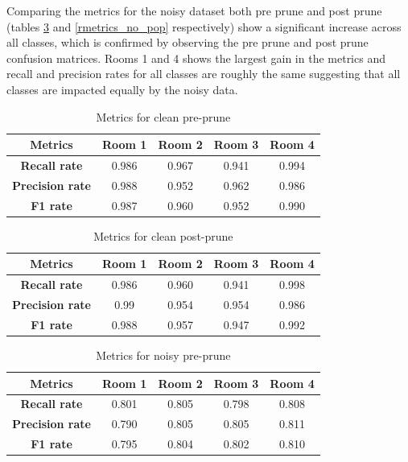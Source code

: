 \documentclass{article}
\begin{document}
Comparing the metrics for the noisy dataset both pre prune and post prune (tables \ref{rmetrics_no_pp} and \ref{rmetrics_no_pop} respectively) show a significant increase across all classes, which is confirmed by observing the pre prune and post prune confusion matrices. Rooms 1 and 4 shows the largest gain in the metrics and recall and precision rates for all classes are roughly the same suggesting that all classes are impacted equally by the noisy data.



\begin{table}[]
\begin{tabular}{|c|c|c|c|c|}
\hline
Metrics                  & \textbf{Room 1} & \textbf{Room 2} & \textbf{Room 3} & \textbf{Room 4} \\ \hline
\textbf{Recall rate}    & 0.986           & 0.967           & 0.941           & 0.994          \\ \hline
\textbf{Precision rate} & 0.988           & 0.952           & 0.962           & 0.986           \\ \hline
\textbf{F1 rate}        & 0.987           & 0.960           & 0.952           & 0.990           \\ \hline
\end{tabular}
\caption{Metrics for clean pre-prune}
\label{rmetrics_cl_pp}
\end{table}

\begin{table}[]
\begin{tabular}{|c|c|c|c|c|}
\hline
Metrics                 & \textbf{Room 1} & \textbf{Room 2} & \textbf{Room 3} & \textbf{Room 4} \\ \hline
\textbf{Recall rate}    & 0.986            & 0.960           & 0.941           & 0.998           \\ \hline
\textbf{Precision rate} & 0.99           & 0.954           & 0.954           & 0.986            \\ \hline
\textbf{F1 rate}        & 0.988           & 0.957           & 0.947          & 0.992           \\ \hline
\end{tabular}
\caption{Metrics for clean post-prune}
\label{rmetrics_cl_pop}
\end{table}

\begin{table}[]
\begin{tabular}{|c|c|c|c|c|}
\hline
Metrics                 & \textbf{Room 1} & \textbf{Room 2} & \textbf{Room 3} & \textbf{Room 4} \\ \hline
\textbf{Recall rate}    & 0.801             & 0.805           & 0.798           & 0.808           \\ \hline
\textbf{Precision rate} & 0.790             & 0.805           & 0.805           & 0.811            \\ \hline
\textbf{F1 rate}        & 0.795             & 0.804            & 0.802           & 0.810           \\ \hline
\end{tabular}
\caption{Metrics for noisy pre-prune}
\label{rmetrics_no_pp}
\end{table}
\end{document}

